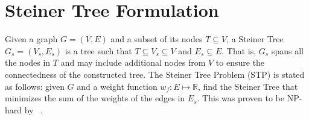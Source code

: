 \documentclass[letterpaper]{article} %
\newcommand{\authornote}[3]{
  {\fbox{\sc 
  #1}:$\blacktriangleright$\textcolor{#2}{\small{#3}}$\blacktriangleleft$}%
}
\newcommand{\ddg}[1]{\authornote{DDG}{blue}{#1}}
\newcommand{\npr}[1]{\authornote{NPR}{orange}{#1}}
\newcommand{\forijcai}[1]{}
\newcommand{\citeasnoun}[1]{\citeauthor{#1}~\shortcite{#1}}
\begin{document}

% 
 

\section{Steiner Tree Formulation \label{SEC:STP}}

Given a graph $G =
(V, E)$ and a subset of its nodes $T \subseteq V$, a 
Steiner Tree $G_s = (V_s, E_s )$ is a tree \forijcai{(connected acyclic graph) }such that 
$T \subseteq V_s \subseteq 
V$ and $E_s \subseteq E$. 
That is\forijcai{In other words}, $G_s$ spans all the nodes in $T$ and 
may include additional nodes from $V$\forijcai{, in particular} to ensure the 
connectedness of the constructed tree. 
The Steiner Tree Problem 
(STP) is stated as follows: given $G$ and a weight function $w_f : E 
\mapsto \mathbb{R}$, find the Steiner Tree that minimizes the sum of the 
weights of the edges in $E_s$\forijcai{ given by $w_f$}. This was proven to be NP-hard 
by \citeasnoun{Karp1972}.
\end{document}
